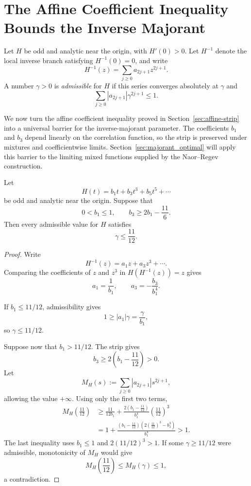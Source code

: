 \section{The Affine Coefficient Inequality Bounds the Inverse Majorant}
\label{sec:strip_majorant}

\begin{definition}\label{def:admissible-majorant}
Let $H$ be odd and analytic near the origin, with $H'(0)>0$. Let $H^{-1}$ denote the local inverse branch satisfying $H^{-1}(0)=0$, and write
\[
        H^{-1}(z)=\sum_{j\ge0}a_{2j+1}z^{2j+1}.
\]
A number $\gamma>0$ is \emph{admissible} for $H$ if this series converges absolutely at $\gamma$ and
\[
        \sum_{j\ge0}|a_{2j+1}|\gamma^{2j+1}\le1.
\]
\end{definition}

We now turn the affine coefficient inequality proved in Section~\ref{sec:affine-strip} into a universal barrier for the inverse-majorant parameter. The coefficients $b_1$ and $b_3$ depend linearly on the correlation function, so the strip is preserved under mixtures and coefficientwise limits. Section~\ref{sec:majorant_optimal} will apply this barrier to the limiting mixed functions supplied by the Naor--Regev construction.

\begin{proposition}\label{prop:majorant-barrier}
Let
\[
        H(t)=b_1t+b_3t^3+b_5t^5+\cdots
\]
be odd and analytic near the origin. Suppose that
\[
        0<b_1\le1,
        \qquad
        b_3\ge2b_1-\frac{11}{6}.
\]
Then every admissible value for $H$ satisfies
\[
        \gamma\le\frac{11}{12}.
\]
\end{proposition}

\begin{proof}
Write
\[
        H^{-1}(z)=a_1z+a_3z^3+\cdots.
\]
Comparing the coefficients of $z$ and $z^3$ in $H(H^{-1}(z))=z$ gives
\[
        a_1=\frac1{b_1},
        \qquad
        a_3=-\frac{b_3}{b_1^4}.
\]

If $b_1\le11/12$, admissibility gives
\[
        1\ge |a_1|\gamma=\frac{\gamma}{b_1},
\]
so $\gamma\le11/12$.

Suppose now that $b_1>11/12$. The strip gives
\[
        b_3\ge2\left(b_1-\frac{11}{12}\right)>0.
\]
Let
\[
        M_H(s):=\sum_{j\ge0}|a_{2j+1}|s^{2j+1},
\]
allowing the value $+\infty$. Using only the first two terms,
\begin{align*}
        M_H\left(\frac{11}{12}\right)
        &\ge
        \frac{11}{12b_1}
        +\frac{2(b_1-\frac{11}{12})}{b_1^4}
          \left(\frac{11}{12}\right)^3\\
        &=1+
        \frac{(b_1-\frac{11}{12})
        \left(2(\frac{11}{12})^3-b_1^3\right)}{b_1^4}
        >1.
\end{align*}
The last inequality uses $b_1\le1$ and $2(11/12)^3>1$. If some $\gamma\ge11/12$ were admissible, monotonicity of $M_H$ would give
\[
        M_H\left(\frac{11}{12}\right)\le M_H(\gamma)\le1,
\]
a contradiction.
\end{proof}

